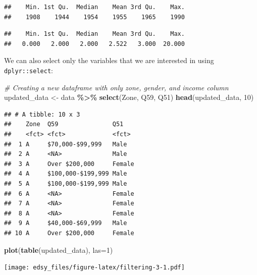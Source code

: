 \documentclass[
]{book}
\newenvironment{Shaded}{\begin{snugshade}}{\end{snugshade}}
\newcommand{\CommentTok}[1]{\textcolor[rgb]{0.56,0.35,0.01}{\textit{#1}}}
\newcommand{\DataTypeTok}[1]{\textcolor[rgb]{0.13,0.29,0.53}{#1}}
\newcommand{\DecValTok}[1]{\textcolor[rgb]{0.00,0.00,0.81}{#1}}
\newcommand{\KeywordTok}[1]{\textcolor[rgb]{0.13,0.29,0.53}{\textbf{#1}}}
\newcommand{\NormalTok}[1]{#1}
\newcommand{\OperatorTok}[1]{\textcolor[rgb]{0.81,0.36,0.00}{\textbf{#1}}}
\newcommand{\StringTok}[1]{\textcolor[rgb]{0.31,0.60,0.02}{#1}}
\begin{document}
\begin{verbatim}
##    Min. 1st Qu.  Median    Mean 3rd Qu.    Max. 
##    1908    1944    1954    1955    1965    1990
\end{verbatim}

\begin{Shaded}
\end{Shaded}

\begin{verbatim}
##    Min. 1st Qu.  Median    Mean 3rd Qu.    Max. 
##   0.000   2.000   2.000   2.522   3.000  20.000
\end{verbatim}

We can also select only the variables that we are interested in using \texttt{dplyr::select}:

\begin{Shaded}
\begin{Highlighting}[]
\CommentTok{\# Creating a new dataframe with only zone, gender, and income column}
\NormalTok{updated\_data \textless{}{-}}\StringTok{ }\NormalTok{data }\OperatorTok{\%\textgreater{}\%}\StringTok{ }\KeywordTok{select}\NormalTok{(Zone, Q59, Q51)}
\KeywordTok{head}\NormalTok{(updated\_data, }\DecValTok{10}\NormalTok{)}
\end{Highlighting}
\end{Shaded}

\begin{verbatim}
## # A tibble: 10 x 3
##    Zone  Q59               Q51   
##    <fct> <fct>             <fct> 
##  1 A     $70,000-$99,999   Male  
##  2 A     <NA>              Male  
##  3 A     Over $200,000     Female
##  4 A     $100,000-$199,999 Male  
##  5 A     $100,000-$199,999 Male  
##  6 A     <NA>              Female
##  7 A     <NA>              Female
##  8 A     <NA>              Female
##  9 A     $40,000-$69,999   Male  
## 10 A     Over $200,000     Female
\end{verbatim}

\begin{Shaded}
\begin{Highlighting}[]
\KeywordTok{plot}\NormalTok{(}\KeywordTok{table}\NormalTok{(updated\_data), }\DataTypeTok{las=}\DecValTok{1}\NormalTok{)}
\end{Highlighting}
\end{Shaded}

\texttt{[image: edsy\_files/figure-latex/filtering-3-1.pdf]}
\end{document}
